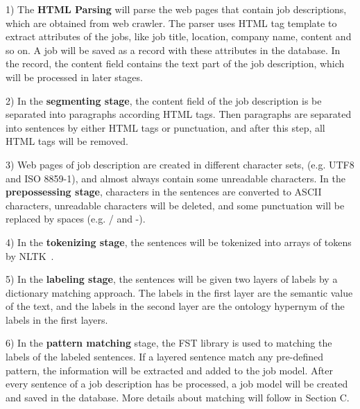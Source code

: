 1) The \textbf{HTML Parsing} will parse the web pages that contain job descriptions, which are obtained from web crawler. The parser uses HTML tag template to extract attributes of the jobs, like job title, location, company name, content and so on. A job will be saved as a record with these attributes in the database. In the record, the content field contains the text part of the job description, which will be processed in later stages.

2) In the \textbf{segmenting stage}, the content field of the job description is be separated into paragraphs according HTML tags. Then paragraphs are separated into sentences by either HTML tags or punctuation, and after this step, all HTML tags will be removed.

3) Web pages of job description are created in different character sets, (e.g. UTF8 and ISO 8859-1), and almost always contain some unreadable characters. In the \textbf{prepossessing stage}, characters in the sentences are converted to ASCII characters, unreadable characters will be deleted, and some punctuation will be replaced by spaces (e.g. / and -).

4) In the \textbf{tokenizing stage}, the sentences will be tokenized into arrays of tokens by NLTK~\cite{bird2006nltk}.

5) In the \textbf{labeling stage}, the sentences will be given two layers of labels by a dictionary matching approach. The labels in the first layer are the semantic value of the text, and the labels in the second layer are the ontology hypernym of the labels in the first layers.

6) In the \textbf{pattern matching} stage, the FST library is used to matching the labels of the labeled sentences.  If a layered sentence match any pre-defined pattern, the information will be extracted and added to the job model. After every sentence of a job description has be processed, a job model will be created and saved in the database. More details about matching will follow in Section C.

